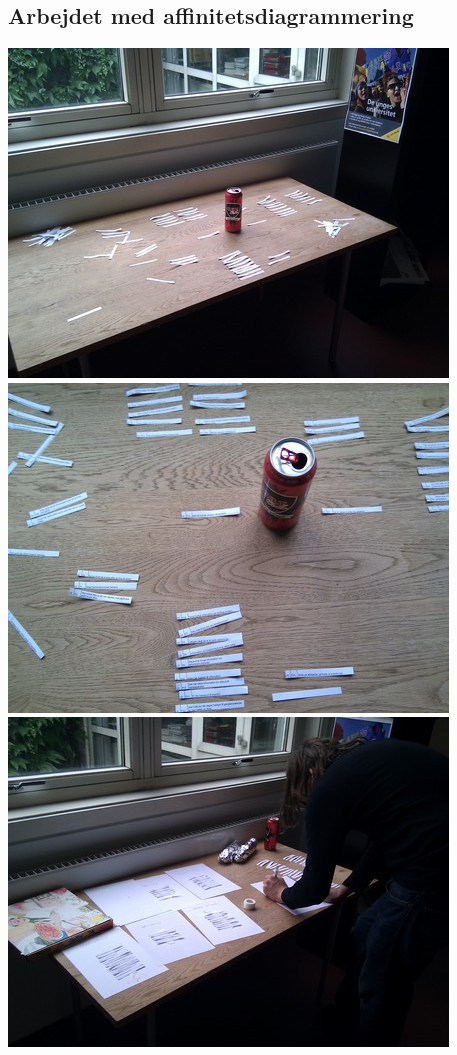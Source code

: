 \begin{appendices}
    \section{Arbejdet med affinitetsdiagrammering}
    \label{b:aff_billeder}
    \includegraphics{affinitet/IMG_20100927_145008.jpg}
    \includegraphics{affinitet/IMG_20100927_145025.jpg}
    \includegraphics{affinitet/IMG_20100927_151239.jpg}

\end{appendices}
